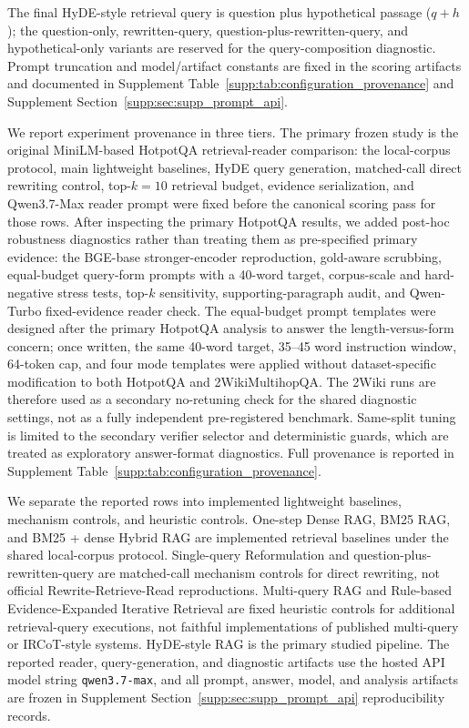 The final HyDE-style retrieval query is question plus hypothetical passage ($q+h$); the question-only, rewritten-query, question-plus-rewritten-query, and hypothetical-only variants are reserved for the query-composition diagnostic. Prompt truncation and model/artifact constants are fixed in the scoring artifacts and documented in Supplement Table~\ref{supp:tab:configuration_provenance} and Supplement Section~\ref{supp:sec:supp_prompt_api}.

We report experiment provenance in three tiers. The primary frozen study is the original MiniLM-based HotpotQA retrieval-reader comparison: the local-corpus protocol, main lightweight baselines, HyDE query generation, matched-call direct rewriting control, top-$k=10$ retrieval budget, evidence serialization, and Qwen3.7-Max reader prompt were fixed before the canonical scoring pass for those rows. After inspecting the primary HotpotQA results, we added post-hoc robustness diagnostics rather than treating them as pre-specified primary evidence: the BGE-base stronger-encoder reproduction, gold-aware scrubbing, equal-budget query-form prompts with a 40-word target, corpus-scale and hard-negative stress tests, top-$k$ sensitivity, supporting-paragraph audit, and Qwen-Turbo fixed-evidence reader check. The equal-budget prompt templates were designed after the primary HotpotQA analysis to answer the length-versus-form concern; once written, the same 40-word target, 35--45 word instruction window, 64-token cap, and four mode templates were applied without dataset-specific modification to both HotpotQA and 2WikiMultihopQA. The 2Wiki runs are therefore used as a secondary no-retuning check for the shared diagnostic settings, not as a fully independent pre-registered benchmark. Same-split tuning is limited to the secondary verifier selector and deterministic guards, which are treated as exploratory answer-format diagnostics. Full provenance is reported in Supplement Table~\ref{supp:tab:configuration_provenance}.

We separate the reported rows into implemented lightweight baselines, mechanism controls, and heuristic controls. One-step Dense RAG, BM25 RAG, and BM25 + dense Hybrid RAG are implemented retrieval baselines under the shared local-corpus protocol. Single-query Reformulation and question-plus-rewritten-query are matched-call mechanism controls for direct rewriting, not official Rewrite-Retrieve-Read reproductions. Multi-query RAG and Rule-based Evidence-Expanded Iterative Retrieval are fixed heuristic controls for additional retrieval-query executions, not faithful implementations of published multi-query or IRCoT-style systems. HyDE-style RAG is the primary studied pipeline. The reported reader, query-generation, and diagnostic artifacts use the hosted API model string \texttt{qwen3.7-max}, and all prompt, answer, model, and analysis artifacts are frozen in Supplement Section~\ref{supp:sec:supp_prompt_api} reproducibility records.

